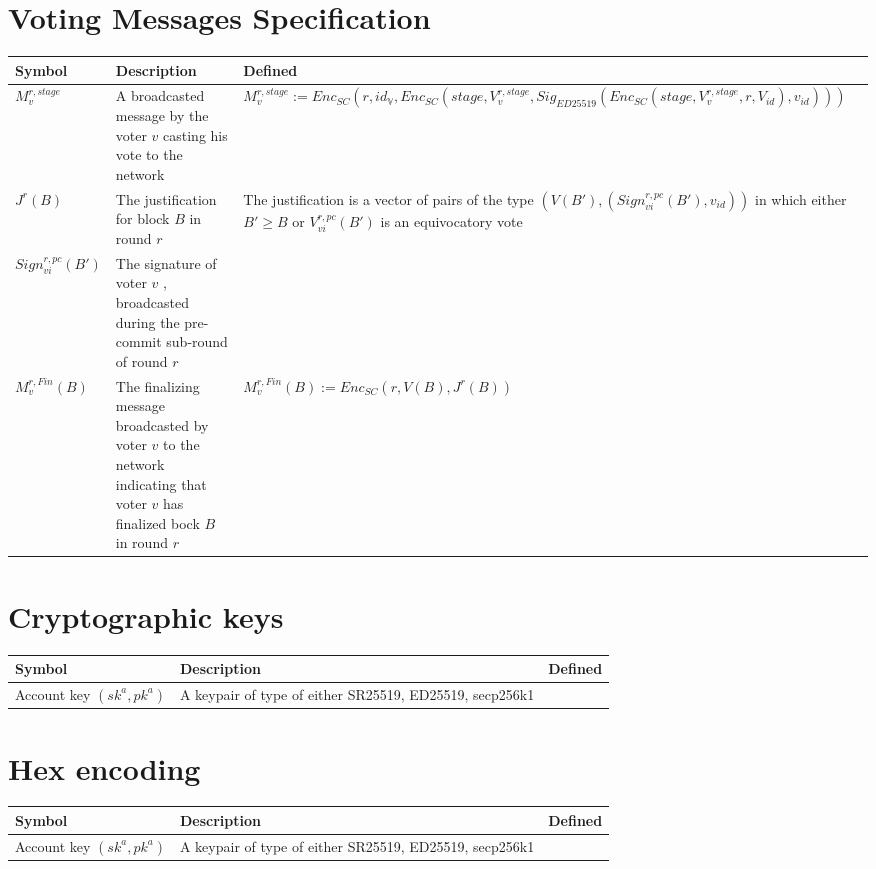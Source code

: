 \documentclass[11pt,a4paper]{article}
\begin{document}
\section*{Voting Messages Specification}
\begin{center}
 \begin{tabulary}{1.0\textwidth}{LLL}
  \textbf{Symbol} & \textbf{Description} & \textbf{Defined} \\
  \hline
\(M^{r,stage}_v\) &A broadcasted message by the voter \(v\) casting his vote to the network& \(M^{r,stage}_v := Enc_{SC}(r,id_\mathbb{V},Enc_{SC}(stage,V^{r,stage}_v,Sig_{ED25519}(Enc_{SC}(stage,V^{r,stage}_v,r,V_{id}),v_{id})))\) \\
\(J^r(B)\) &The justification for block \(B\) in round \(r\) &The justification is a vector of pairs of the type \((V(B'),(Sign^{r,pc}_{vi}(B'),v_{id}))\) in which either \(B'\geq B\) or \(V^{r,pc}_{vi}(B')\) is an equivocatory vote\\
\(Sign^{r,pc}_{vi}(B')\) &The signature of voter \(v\) , broadcasted during the pre-commit sub-round of round \(r\) \\
\(M^{r,Fin}_v(B)\) &The finalizing message broadcasted by voter \(v\) to the network indicating that voter \(v\) has finalized bock \(B\) in round \(r\) & \(M^{r,Fin}_v(B) := Enc_{SC}(r,V(B),J^r(B))\) \\
 \end{tabulary}
\end{center}

\section*{Cryptographic keys}
\begin{center}
 \begin{tabulary}{1.0\textwidth}{LLL}
  \textbf{Symbol} & \textbf{Description} & \textbf{Defined} \\
  \hline
Account key \((sk^a, pk^a)\) &A keypair of type of either SR25519, ED25519, secp256k1&\\
 \end{tabulary}
\end{center}

\section*{Hex encoding}
\begin{center}
 \begin{tabulary}{1.0\textwidth}{LLL}
  \textbf{Symbol} & \textbf{Description} & \textbf{Defined} \\
  \hline
Account key \((sk^a, pk^a)\) &A keypair of type of either SR25519, ED25519, secp256k1&\\
 \end{tabulary}
\end{center}

\newpage
\end{document}
